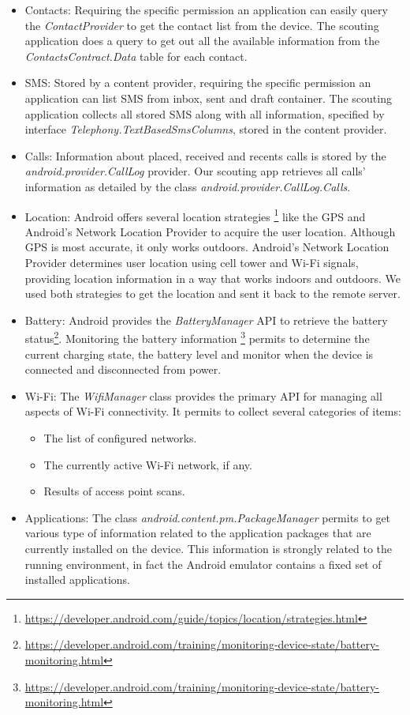 \begin{itemize}
\item Contacts: Requiring the specific permission an application can easily query the \textit{ContactProvider} to get the contact list from the device. The scouting application does a query to get out all the available information from the \textit{ContactsContract.Data} table for each contact.
\item SMS: Stored by a content provider, requiring the specific permission an application can list SMS from inbox, sent and draft container. The scouting application collects all stored SMS along with all information, specified by interface \textit{Telephony.TextBasedSmsColumns}, stored in the content provider.
\item Calls: Information about placed, received and recents calls is stored by the \textit{android.provider.CallLog} provider. Our scouting app retrieves all calls' information as detailed by the class \textit{android.provider.CallLog.Calls}.
\item Location: Android offers several location strategies \footnote{\url{https://developer.android.com/guide/topics/location/strategies.html}} like the GPS and Android's Network Location Provider to acquire the user location. Although GPS is most accurate, it only works outdoors. Android's Network Location Provider determines user location using cell tower and Wi-Fi signals, providing location information in a way that works indoors and outdoors. We used both strategies to get the location and sent it back to the remote server.
\item Battery: Android provides the \textit{BatteryManager} API to retrieve the battery status\footnote{\url{https://developer.android.com/training/monitoring-device-state/battery-monitoring.html}}. Monitoring the battery information \footnote{\url{https://developer.android.com/training/monitoring-device-state/battery-monitoring.html}}  permits to determine the current charging state, the battery level and monitor when the device is connected and disconnected from power.
\item Wi-Fi: The \textit{WifiManager} class provides the primary API for managing all aspects of Wi-Fi connectivity. It permits to collect several categories of items:
\begin{itemize}
\item The list of configured networks.
\item The currently active Wi-Fi network, if any.
\item Results of access point scans.
\end{itemize}
\item Applications: The class \textit{android.content.pm.PackageManager} permits to get various type of information related to the application packages that are currently installed on the device. This information is strongly related to the running environment, in fact the Android emulator contains a fixed set of installed applications. 
\end{itemize}